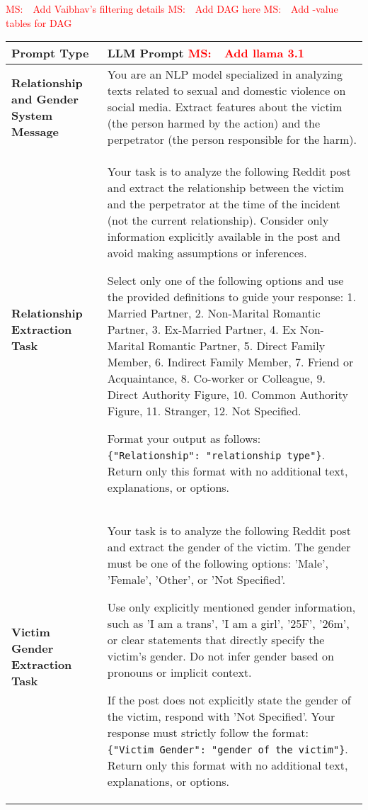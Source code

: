 \documentclass[11pt]{article}
\newcommand{\ms}[1]{\textcolor{red}{{MS:~~#1}}}
\begin{document}
\ms{Add Vaibhav's filtering details}
\ms{Add DAG here}
\ms{Add -value tables for DAG}

\begin{table}[htb]
\centering
\begin{tabular}{|p{4cm}|p{12cm}|}
\hline
\textbf{Prompt Type} & \textbf{LLM Prompt \ms{Add llama 3.1}} \\ \hline
\textbf{Relationship and Gender System Message} & 
You are an NLP model specialized in analyzing texts related to sexual and domestic violence on social media. Extract features about the victim (the person harmed by the action) and the perpetrator (the person responsible for the harm). \\ \hline

\textbf{Relationship Extraction Task} & 
Your task is to analyze the following Reddit post and extract the relationship between the victim and the perpetrator at the time of the incident (not the current relationship). Consider only information explicitly available in the post and avoid making assumptions or inferences. 

Select only one of the following options and use the provided definitions to guide your response: 
1. Married Partner, 2. Non-Marital Romantic Partner, 3. Ex-Married Partner, 4. Ex Non-Marital Romantic Partner, 5. Direct Family Member, 6. Indirect Family Member, 7. Friend or Acquaintance, 8. Co-worker or Colleague, 9. Direct Authority Figure, 10. Common Authority Figure, 11. Stranger, 12. Not Specified.

Format your output as follows: \texttt{\{"Relationship": "relationship type"\}}. Return only this format with no additional text, explanations, or options. \\ \hline

\textbf{Victim Gender Extraction Task} & 
Your task is to analyze the following Reddit post and extract the gender of the victim. The gender must be one of the following options: 'Male', 'Female', 'Other', or 'Not Specified'. 

Use only explicitly mentioned gender information, such as 'I am a trans', 'I am a girl', '25F', '26m', or clear statements that directly specify the victim's gender. Do not infer gender based on pronouns or implicit context. 

If the post does not explicitly state the gender of the victim, respond with 'Not Specified'. Your response must strictly follow the format: \texttt{\{"Victim Gender": "gender of the victim"\}}. Return only this format with no additional text, explanations, or options. \\ \hline


\end{tabular}
\end{table}
\end{document}
